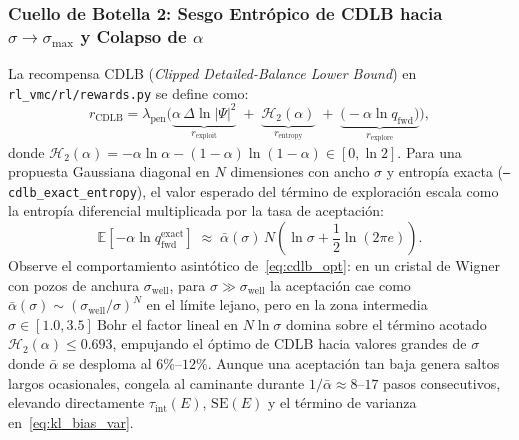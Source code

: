 \documentclass[10pt,a4paper]{article}
\begin{document}
\subsubsection*{Cuello de Botella 2: Sesgo Entrópico de CDLB hacia $\sigma \to \sigma_{\max}$ y Colapso de $\alpha$}
La recompensa CDLB (\textit{Clipped Detailed-Balance Lower Bound}) en \texttt{rl\_vmc/rl/rewards.py} se define como:
\begin{equation}
r_{\mathrm{CDLB}} = \lambda_{\mathrm{pen}} \Big( \underbrace{\alpha\,\Delta\ln|\Psi|^2}_{r_{\mathrm{exploit}}} \;+\; \underbrace{\mathcal{H}_2(\alpha)}_{r_{\mathrm{entropy}}} \;+\; \underbrace{\big(-\alpha\ln q_{\mathrm{fwd}}\big)}_{r_{\mathrm{explore}}} \Big),
\label{eq:cdlb}
\end{equation}
donde $\mathcal{H}_2(\alpha) = -\alpha\ln\alpha - (1-\alpha)\ln(1-\alpha) \in [0, \ln 2]$. Para una propuesta Gaussiana diagonal en $N$ dimensiones con ancho $\sigma$ y entropía exacta (\texttt{--cdlb\_exact\_entropy}), el valor esperado del término de exploración escala como la entropía diferencial multiplicada por la tasa de aceptación:
\begin{equation}
\mathbb{E}\!\left[-\alpha\ln q_{\mathrm{fwd}}^{\mathrm{exact}}\right] \;\approx\; \bar{\alpha}(\sigma)\, N \left(\ln\sigma + \frac{1}{2}\ln(2\pi e)\right).
\label{eq:cdlb_opt}
\end{equation}
Observe el comportamiento asintótico de~\eqref{eq:cdlb_opt}: en un cristal de Wigner con pozos de anchura $\sigma_{\mathrm{well}}$, para $\sigma \gg \sigma_{\mathrm{well}}$ la aceptación cae como $\bar{\alpha}(\sigma) \sim (\sigma_{\mathrm{well}}/\sigma)^N$ en el límite lejano, pero en la zona intermedia $\sigma \in [1.0, 3.5]\ \mathrm{Bohr}$ el factor lineal en $N\ln\sigma$ domina sobre el término acotado $\mathcal{H}_2(\alpha) \le 0.693$, empujando el óptimo de CDLB hacia valores grandes de $\sigma$ donde $\bar{\alpha}$ se desploma al $6\%\text{--}12\%$. Aunque una aceptación tan baja genera saltos largos ocasionales, congela al caminante durante $1/\bar{\alpha} \approx 8\text{--}17$ pasos consecutivos, elevando directamente $\tau_{\mathrm{int}}(E)$, $\mathrm{SE}(E)$ y el término de varianza en~\eqref{eq:kl_bias_var}.
\end{document}
